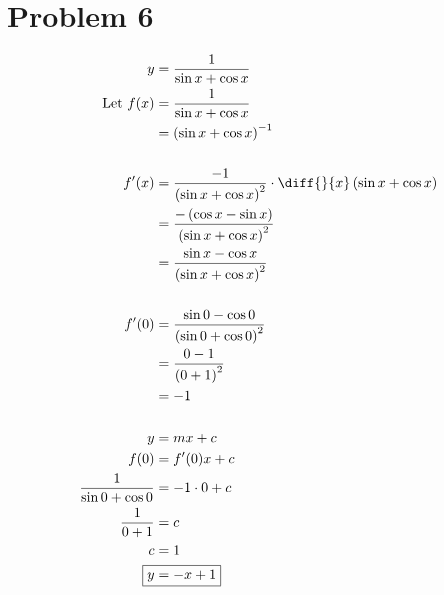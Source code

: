 \documentclass{article}
\begin{document}
\section*{Problem 6}
    \begin{align*}
        y&=\frac{1}{\sin x+\cos x} \\
        \text{Let }f(x)&=\frac{1}{\sin x+\cos x} \\
        &=\left(\sin x+\cos x\right)^{-1} \\
        \\
        f'(x)&=\frac{-1}{\left(\sin x+\cos x\right)^2}\cdot\diff{}{x}\left(\sin x+\cos x\right) \\
        &=\frac{-\left(\cos x-\sin x\right)}{\left(\sin x+\cos x\right)^2} \\
        &=\frac{\sin x-\cos x}{\left(\sin x+\cos x\right)^2} \\
        \\
        f'(0)&=\frac{\sin0-\cos0}{\left(\sin0+\cos0\right)^2} \\
        &=\frac{0-1}{\left(0+1\right)^2} \\
        &=-1 \\
        \\
        y&=mx+c \\
        f(0)&=f'(0)x+c \\
        \frac{1}{\sin0+\cos0}&=-1\cdot0+c \\
        \frac{1}{0+1}&=c \\
        c&=1 \\
        \Aboxed{y&=-x+1} \\
    \end{align*}
\end{document}
